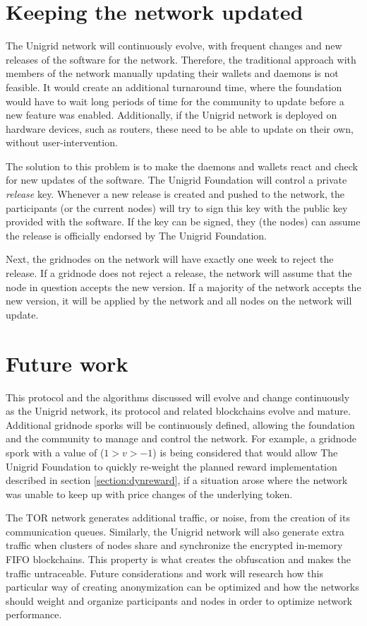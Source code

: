 \documentclass[10pt,a4paper,final]{article}
\begin{document}
\section{Keeping the network updated}
The Unigrid network will continuously evolve, with frequent changes and new releases of the software for the network. Therefore, the traditional approach with members of the network manually updating their wallets and daemons is not feasible. It would create an additional turnaround time, where the foundation would have to wait long periods of time for the community to update before a new feature was enabled. Additionally, if the Unigrid network is deployed on hardware devices, such as routers, these need to be able to update on their own, without user-intervention.

The solution to this problem is to make the daemons and wallets react and check for new updates of the software. The Unigrid Foundation will control a private \emph{release} key. Whenever a new release is created and pushed to the network, the participants (or the current nodes) will try to sign this key with the public key provided with the software. If the key can be signed, they (the nodes) can assume the release is officially endorsed by The Unigrid Foundation.

Next, the \glspl{gridnode} on the network will have exactly one week to reject the release. If a \gls{gridnode} does not reject a release, the network will assume that the node in question accepts the new version. If a majority of the network accepts the new version, it will be applied by the network and all nodes on the network will update.

\pagebreak
\section{Future work}
This protocol and the algorithms discussed will evolve and change continuously as the Unigrid network, its protocol and related blockchains evolve and mature. Additional \gls{gridnode} sporks will be continuously defined, allowing the foundation and the community to manage and control the network. For example, a \gls{gridnode} spork with a value of ($1 > v > -1$) is being considered that would allow The Unigrid Foundation to quickly re-weight the planned reward implementation described in section \ref{section:dynreward}, if a situation arose where the network was unable to keep up with price changes of the underlying token.

The TOR network generates additional traffic, or noise, from the creation of its communication queues. Similarly, the Unigrid network will also generate extra traffic when clusters of nodes share and synchronize the encrypted in-memory FIFO blockchains. This property is what creates the obfuscation and makes the traffic untraceable. Future considerations and work will research how this particular way of creating anonymization can be optimized and how the networks should weight and organize participants and nodes in order to optimize network performance.
\end{document}
